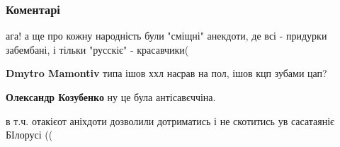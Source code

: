  
 
 
 
 
\subsubsection{Коментарі}

\begin{itemize}
 
ага! а ще про кожну народність були "сміщні" анекдоти, де всі - придурки забембані, і тільки "русскіє" - красавчики(

\begin{itemize}
 
\textbf{Dmytro Mamontiv} типа ішов ххл насрав на пол, ішов кцп зубами цап?

 
\textbf{Олександр Козубенко} ну це була антісавєччіна.

 
в т.ч. отакієот аніхдоти дозволили дотриматись і не скотитись ув сасатаяніє БІлорусі ((
\end{itemize}

 


\end{itemize}
